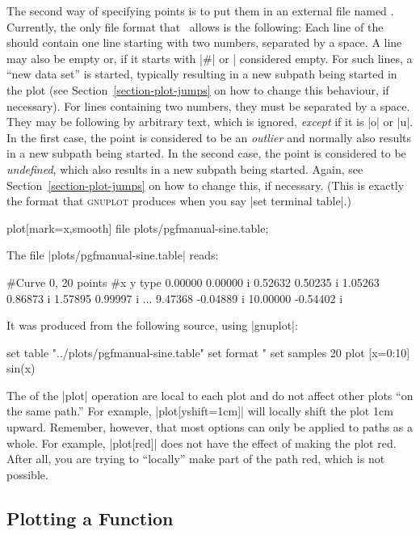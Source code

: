 The second way of specifying points is to put them in an external
file named . Currently, the only file format that
\tikzname\ allows is the following: Each line of the 
should contain one line starting with two numbers, separated by a
space. A line may also be empty or, if it starts with |#| or |%
considered empty. For such lines, a ``new data set'' is started,
typically resulting in a new subpath being started in the plot (see
Section~\ref{section-plot-jumps} on how to change this behaviour, if
necessary). For lines containing two numbers, they must be separated
by a space. They may be following by arbitrary text, which is ignored,
\emph{except} if it is |o| or |u|. In the first case, the point is
considered to be an \emph{outlier} and normally also results in a new
subpath being started. In the second case, the point is considered to
be \emph{undefined}, which also results in a new subpath being
started. Again, see Section~\ref{section-plot-jumps} on how to change
this, if necessary. (This is exactly the format that \textsc{gnuplot}
produces when you say |set terminal table|.) 

\begin{codeexample}[]
\tikz \draw plot[mark=x,smooth] file {plots/pgfmanual-sine.table};
\end{codeexample}

The file |plots/pgfmanual-sine.table| reads:
\begin{codeexample}
#Curve 0, 20 points
#x y type
0.00000 0.00000  i
0.52632 0.50235  i
1.05263 0.86873  i
1.57895 0.99997  i
...
9.47368 -0.04889  i
10.00000 -0.54402  i
\end{codeexample}
It was produced from the following source, using |gnuplot|:
\begin{codeexample}
set table  "../plots/pgfmanual-sine.table"
set format "%
set samples 20
plot [x=0:10] sin(x)
\end{codeexample}

The  of the |plot| operation are local to each
plot and do not affect other plots ``on the same path.'' For example,
|plot[yshift=1cm]| will locally shift the plot 1cm upward. Remember,
however, that most options can only be applied to paths as a
whole. For example, |plot[red]| does not have the effect of making the
plot red. After all, you are trying to ``locally'' make part of the
path red, which is not possible.

\subsection{Plotting a Function}
\label{section-tikz-plot}

